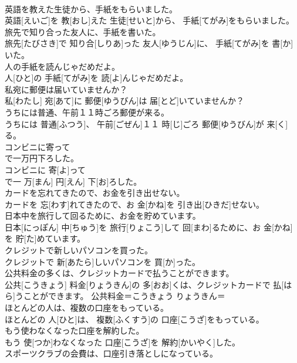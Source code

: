\documentclass[8pt]{extreport}
\begin{document}
\begin{CJK}{UTF8}{min}
\\	英語を教えた生徒から、手紙をもらいました。	
\\	英語[えいご]を 教[おし]えた 生徒[せいと]から、 手紙[てがみ]をもらいました。	
\\	旅先で知り合った友人に、手紙を書いた。	
\\	旅先[たびさき]で 知り合[しりあ]った 友人[ゆうじん]に、 手紙[てがみ]を 書[か]いた。	
\\	人の手紙を読んじゃだめだよ。	
\\	人[ひと]の 手紙[てがみ]を 読[よ]んじゃだめだよ。	
\\	私宛に郵便は届いていませんか？	
\\	私[わたし] 宛[あて]に 郵便[ゆうびん]は 届[とど]いていませんか？	
\\	うちには普通、午前１１時ごろ郵便が来る。	
\\	うちには 普通[ふつう]、 午前[ごぜん]１１ 時[じ]ごろ 郵便[ゆうびん]が 来[く]る。	
\\	コンビニに寄って
\\	で一万円下ろした。	
\\	コンビニに 寄[よ]って 
\\	で一 万[まん] 円[えん] 下[お]ろした。	
\\	カードを忘れてきたので、お金を引き出せない。	
\\	カードを 忘[わす]れてきたので、お 金[かね]を 引き出[ひきだ]せない。	
\\	日本中を旅行して回るために、お金を貯めています。	
\\	日本[にっぽん] 中[ちゅう]を 旅行[りょこう]して 回[まわ]るために、お 金[かね]を 貯[た]めています。	
\\	クレジットで新しいパソコンを買った。	
\\	クレジットで 新[あたら]しいパソコンを 買[か]った。	
\\	公共料金の多くは、クレジットカードで払うことができます。	
\\	公共[こうきょう] 料金[りょうきん]の 多[おお]くは、クレジットカードで 払[はら]うことができます。	公共料金＝こうきょう りょうきん＝ 
\\	ほとんどの人は、複数の口座をもっている。	
\\	ほとんどの 人[ひと]は、 複数[ふくすう]の 口座[こうざ]をもっている。	
\\	もう使わなくなった口座を解約した。	
\\	もう 使[つか]わなくなった 口座[こうざ]を 解約[かいやく]した。	
\\	スポーツクラブの会費は、口座引き落としになっている。	

\end{CJK}
\end{document}
